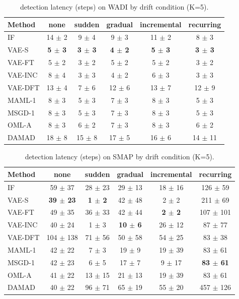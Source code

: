 \begin{table}[t]
\centering
\small
\caption{detection latency (steps) on WADI by drift condition (K=5).}
\label{tab:drift_latency_mean_wadi}
\begin{tabular}{lccccc}
\toprule
Method & none & sudden & gradual & incremental & recurring \\
\midrule
IF & 14 $\pm$ 2 & 9 $\pm$ 4 & 9 $\pm$ 3 & 11 $\pm$ 2 & 8 $\pm$ 3 \\
VAE-S & \textbf{5 $\pm$ 3} & \textbf{3 $\pm$ 3} & \textbf{4 $\pm$ 2} & \textbf{5 $\pm$ 3} & \textbf{3 $\pm$ 3} \\
VAE-FT & 5 $\pm$ 2 & 3 $\pm$ 2 & 5 $\pm$ 2 & 5 $\pm$ 2 & 3 $\pm$ 2 \\
VAE-INC & 8 $\pm$ 4 & 3 $\pm$ 3 & 4 $\pm$ 2 & 6 $\pm$ 3 & 3 $\pm$ 3 \\
VAE-DFT & 13 $\pm$ 4 & 7 $\pm$ 6 & 12 $\pm$ 6 & 13 $\pm$ 7 & 12 $\pm$ 9 \\
MAML-1 & 8 $\pm$ 3 & 5 $\pm$ 3 & 7 $\pm$ 3 & 8 $\pm$ 3 & 5 $\pm$ 3 \\
MSGD-1 & 8 $\pm$ 3 & 5 $\pm$ 3 & 7 $\pm$ 3 & 8 $\pm$ 3 & 5 $\pm$ 3 \\
OML-A & 8 $\pm$ 3 & 6 $\pm$ 2 & 7 $\pm$ 3 & 8 $\pm$ 3 & 6 $\pm$ 2 \\
DAMAD & 18 $\pm$ 8 & 15 $\pm$ 8 & 17 $\pm$ 5 & 16 $\pm$ 6 & 14 $\pm$ 11 \\
\bottomrule
\end{tabular}
\end{table}

\begin{table}[t]
\centering
\small
\caption{detection latency (steps) on SMAP by drift condition (K=5).}
\label{tab:drift_latency_mean_smap}
\begin{tabular}{lccccc}
\toprule
Method & none & sudden & gradual & incremental & recurring \\
\midrule
IF & 59 $\pm$ 37 & 28 $\pm$ 23 & 29 $\pm$ 13 & 18 $\pm$ 16 & 126 $\pm$ 59 \\
VAE-S & \textbf{39 $\pm$ 23} & \textbf{1 $\pm$ 2} & 42 $\pm$ 48 & 2 $\pm$ 2 & 211 $\pm$ 69 \\
VAE-FT & 49 $\pm$ 35 & 36 $\pm$ 33 & 42 $\pm$ 44 & \textbf{2 $\pm$ 2} & 107 $\pm$ 101 \\
VAE-INC & 40 $\pm$ 24 & 1 $\pm$ 3 & \textbf{10 $\pm$ 6} & 26 $\pm$ 12 & 87 $\pm$ 77 \\
VAE-DFT & 104 $\pm$ 138 & 71 $\pm$ 56 & 50 $\pm$ 58 & 54 $\pm$ 25 & 83 $\pm$ 38 \\
MAML-1 & 42 $\pm$ 22 & 7 $\pm$ 3 & 19 $\pm$ 9 & 19 $\pm$ 39 & 83 $\pm$ 61 \\
MSGD-1 & 42 $\pm$ 23 & 6 $\pm$ 5 & 17 $\pm$ 7 & 9 $\pm$ 17 & \textbf{83 $\pm$ 61} \\
OML-A & 41 $\pm$ 22 & 13 $\pm$ 15 & 21 $\pm$ 13 & 19 $\pm$ 39 & 83 $\pm$ 61 \\
DAMAD & 40 $\pm$ 22 & 96 $\pm$ 71 & 65 $\pm$ 19 & 55 $\pm$ 20 & 457 $\pm$ 126 \\
\bottomrule
\end{tabular}
\end{table}

